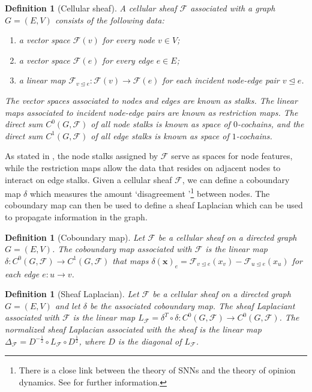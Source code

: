 \documentclass[11pt,a4paper,openright,twoside]{report}
\newcounter{mycounter}
\theoremstyle{plain}
\newtheorem{definition}[mycounter]{Definition}
\theoremstyle{definition}
\begin{document}
\begin{definition}[Cellular sheaf]
  A cellular sheaf $\mathcal{F}$ associated with a graph $G = (E,V)$ consists of the following data:
  \begin{enumerate}
    \item a vector space $\mathcal{F}(v)$ for every node $v \in V$;
    \item a vector space $\mathcal{F}(e)$ for every edge $e \in E$;
    \item a linear map $\mathcal{F}_{v \trianglelefteq e}: \mathcal{F}(v) \to \mathcal{F}(e)$ for each incident node-edge pair $v \trianglelefteq e$.
  \end{enumerate}
  The vector spaces associated to nodes and edges are known as stalks. The linear maps associated to incident node-edge pairs are known as restriction maps. The direct sum $C^0(G, \mathcal{F})$ of all node stalks is known as space of $0$-cochains, and the direct sum $C^1(G, \mathcal{F})$ of all edge stalks is known as space of $1$-cochains.
\end{definition}

As stated in \cite{zaghen2024nonlinear}, the  node stalks assigned by $\mathcal{F}$ serve as spaces for node features, while the restriction maps allow the data that resides on adjacent nodes to interact on edge stalks. Given a cellular sheaf $\mathcal{F}$, we can define a coboundary map $\delta$ which measures the amount \lq disagreement \rq\footnote{There is a close link between the theory of SNNs and the theory of opinion dynamics. See \cite{zaghen2024nonlinear} for further information.} between nodes. The coboundary map can then be used to define a sheaf Laplacian which can be used to propagate information in the graph.

\begin{definition}[Coboundary map]
  Let $\mathcal{F}$ be a cellular sheaf on a directed graph $G = (E,V)$. The coboundary map associated with $\mathcal{F}$ is the linear map $\delta: C^0(G, \mathcal{F}) \to C^1(G, \mathcal{F})$ that maps $\delta(\mathbf{x})_{e} = \mathcal{F}_{v \trianglelefteq e}(x_v) - \mathcal{F}_{u \trianglelefteq e}(x_u)$ for each edge $e: u \to v$.
\end{definition}

\begin{definition}[Sheaf Laplacian]
  Let $\mathcal{F}$ be a cellular sheaf on a directed graph $G = (E,V)$ and let $\delta$ be the associated coboundary map. The sheaf Laplaciant associated with $\mathcal{F}$ is the linear map $L_{\mathcal{F}} = \delta^T \circ \delta: C^0(G, \mathcal{F}) \to C^0(G, \mathcal{F})$. The normalized sheaf Laplacian associated with the sheaf is the linear map $\Delta_{\mathcal{F}} = D^{-\frac{1}{2}} \circ L_{\mathcal{F}} \circ D^{\frac{1}{2}}$, where $D$ is the diagonal of $L_{\mathcal{F}}$.
\end{definition}
\end{document}
